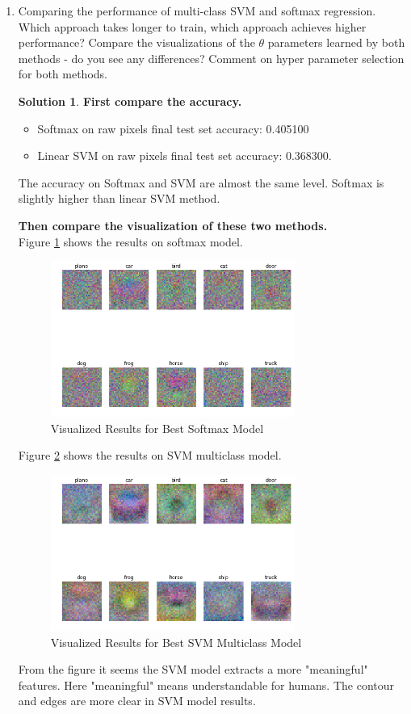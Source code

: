 \documentclass[]{book}
\theoremstyle{definition}
\newtheorem*{soln}{Solution}
\begin{document}
\begin{enumerate}
	
	\item Comparing the performance of multi-class SVM and softmax regression. Which approach takes longer to train, which approach achieves higher performance? Compare the visualizations of the $\theta$ parameters learned by both methods - do you see any differences? Comment on hyper parameter selection for both methods.
	\begin{soln}
		\textbf{First compare the accuracy.}
		\begin{itemize}  
			\item Softmax on raw pixels final test set accuracy: 0.405100
			\item Linear SVM on raw pixels final test set accuracy: 0.368300.
		\end{itemize}
	    The accuracy on Softmax and SVM are almost the same level. Softmax is slightly higher than linear SVM method.
	    
	    \textbf{Then compare the visualization of these two methods.}\\
	    Figure \ref{fig:softmax} shows the results on softmax model.
	    \begin{figure}[H]
	    	\centering
	    	\includegraphics[width=8cm]{softmax_res.png}
	    	\caption{Visualized Results for Best Softmax Model}
	    	\label{fig:softmax}
	    \end{figure}
	    Figure \ref{fig:SVM} shows the results on SVM multiclass model.
	    \begin{figure}[H]
	    	\centering
	    	\includegraphics[width=8cm]{multiSVM_final.png}
	    	\caption{Visualized Results for Best SVM Multiclass Model}
	    	\label{fig:SVM}
	    \end{figure}
	    From the figure it seems the SVM model extracts a more "meaningful" features. Here "meaningful" means understandable for humans. The contour and edges are more clear in SVM model results.
	    

\end{soln}
\end{enumerate}
\end{document}
